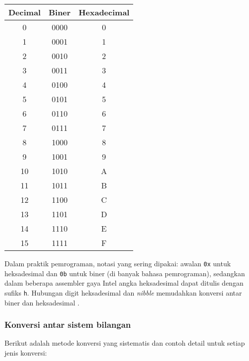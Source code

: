\begin{center}
\begin{tabular}{|c|c|c|}
\hline
\textbf{Decimal} & \textbf{Biner} & \textbf{Hexadecimal} \\
\hline
0 & 0000 & 0 \\
1 & 0001 & 1 \\
2 & 0010 & 2 \\
3 & 0011 & 3 \\
4 & 0100 & 4 \\
5 & 0101 & 5 \\
6 & 0110 & 6 \\
7 & 0111 & 7 \\
8 & 1000 & 8 \\
9 & 1001 & 9 \\
10 & 1010 & A \\
11 & 1011 & B \\
12 & 1100 & C \\
13 & 1101 & D \\
14 & 1110 & E \\
15 & 1111 & F \\
\hline
\end{tabular}
\end{center}

Dalam praktik pemrograman, notasi yang sering dipakai: awalan \texttt{0x} untuk heksadesimal dan \texttt{0b} untuk biner (di banyak bahasa pemrograman), sedangkan dalam beberapa assembler gaya Intel angka heksadesimal dapat ditulis dengan sufiks \texttt{h}. Hubungan digit heksadesimal dan \textit{nibble} memudahkan konversi antar biner dan heksadesimal \cite{wiki_hexadecimal}.

\subsubsection{Konversi antar sistem bilangan}

Berikut adalah metode konversi yang sistematis dan contoh detail untuk setiap jenis konversi:

